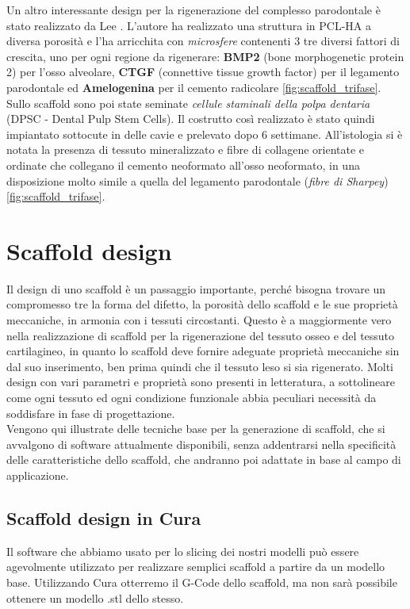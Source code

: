 Un altro interessante design per la rigenerazione del complesso parodontale è stato realizzato da Lee \parencite{Reference135}. L'autore ha realizzato una struttura in PCL-HA a diversa porosità e l'ha arricchita con \emph{microsfere} contenenti 3 tre diversi fattori di crescita, uno per ogni regione da rigenerare: \textbf{BMP2} (bone morphogenetic protein 2) per l'osso alveolare, \textbf{CTGF} (connettive tissue growth factor) per il legamento parodontale ed \textbf{Amelogenina} per il cemento radicolare \ref{fig:scaffold_trifase}.\\
Sullo scaffold sono poi state seminate \emph{cellule staminali della polpa dentaria} (DPSC - Dental Pulp Stem Cells). Il costrutto così realizzato è stato quindi impiantato sottocute in delle cavie e prelevato dopo 6 settimane. All'istologia si è notata la presenza di tessuto mineralizzato e fibre di collagene orientate e ordinate che collegano il cemento neoformato all'osso neoformato, in una disposizione molto simile a quella del legamento parodontale (\emph{fibre di Sharpey}) \ref{fig:scaffold_trifase}.

\section{Scaffold design}
Il design di uno scaffold è un passaggio importante, perché bisogna trovare un compromesso tre la forma del difetto, la porosità dello scaffold e le sue proprietà meccaniche, in armonia con i tessuti circostanti. Questo è a maggiormente vero nella realizzazione di scaffold per la rigenerazione del tessuto osseo e del tessuto cartilagineo, in quanto lo scaffold deve fornire adeguate proprietà meccaniche sin dal suo inserimento, ben prima quindi che il tessuto leso si sia rigenerato. Molti design con vari parametri e proprietà sono presenti in letteratura, a sottolineare come ogni tessuto ed ogni condizione funzionale abbia peculiari necessità da soddisfare in fase di progettazione.\\
Vengono qui illustrate delle tecniche base per la generazione di scaffold, che si avvalgono di software attualmente disponibili, senza addentrarsi nella specificità delle caratteristiche dello scaffold, che andranno poi adattate in base al campo di applicazione.

\subsection{Scaffold design in Cura}
Il software che abbiamo usato per lo slicing dei nostri modelli può essere agevolmente utilizzato per realizzare semplici scaffold a partire da un modello base. Utilizzando Cura otterremo il G-Code dello scaffold, ma non sarà possibile ottenere un modello .stl dello stesso.

